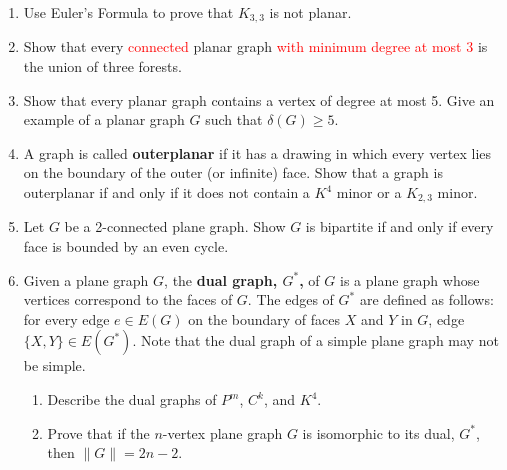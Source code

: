 \documentclass[12pt]{article}
\renewcommand{\emph}[1]{\textsf{\textbf{#1}}}
\begin{document}
\begin{enumerate}
	\item Use Euler's Formula to prove that $K_{3,3}$ is not planar.
	\item Show that every \textcolor{red}{connected} planar graph \textcolor{red}{with minimum degree at most 3} is the union of three forests. 
	\item Show that every planar graph contains a vertex of degree at most 5. Give an example of a planar graph $G$ such that $\delta(G) \geq 5.$
	\item A graph is called \emph{outerplanar} if it has a drawing in which every vertex lies on the boundary of the outer (or infinite) face. Show that a graph is outerplanar if and only if it does not contain a $K^4$ minor or a $K_{2,3}$ minor.
	\item Let $G$ be a 2-connected plane graph. Show $G$ is bipartite if and only if every face is bounded by an even cycle.
	\item Given a plane graph $G$, the \emph{dual graph, $G^*$,} of $G$ is a plane graph whose vertices correspond to the faces of $G$. The edges of $G^*$ are defined as follows: for every edge $e \in E(G)$ on the boundary of faces $X$ and $Y$ in $G$, edge $\{X,Y\} \in E(G^*).$ Note that the dual graph of a simple plane graph may not be simple.
	\begin{enumerate}
	\item Describe the dual graphs of $P^m$, $C^k$, and $K^4.$
	\item Prove that if the $n$-vertex plane graph $G$ is isomorphic to its dual, $G^*$, then $\parallel G \parallel = 2n-2.$
	\end{enumerate}
\end{enumerate}
\end{document}
